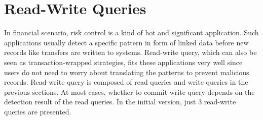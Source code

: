 


\section{Read-Write Queries}
\label{sec:rw-queries}

In financial scenario, risk control is a kind of hot and significant application.
Such applications usually detect a specific pattern in form of linked data before
new records like transfers are written to systems. Read-write query, which can also
be seen as transaction-wrapped strategies, fits these applications very well since
users do not need to worry about translating the patterns to prevent malicious records.
Read-write query is composed of read queries and write queries in the previous sections.
At most cases, whether to commit write query depends on the detection result of the
read queries. In the initial version, just 3 read-write queries are presented.



